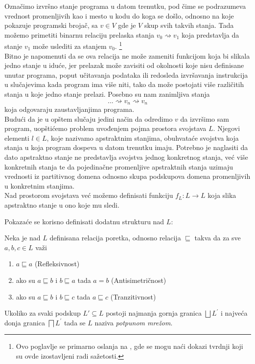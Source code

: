 Označimo izvršno stanje programa u datom trenutku, pod čime se podrazumeva vrednost promenljivih kao i mesto u kodu do koga se došlo, odnosno na koje pokazuje programski brojač, sa $v \in V$ gde je $V$ skup svih takvih stanja. Tada možemo primetiti binarnu relaciju prelaska stanja $v_{0} \rightsquigarrow v_{1}$ koja predstavlja da stanje $v_{1}$ može uslediti za stanjem $v_{0}$. \footnote{Ovo poglavlje se primarno oslanja na \cite{salcianu}, gde se mogu naći dokazi tvrdnji koji su ovde izostavljeni radi sažetosti.} \\

Bitno je napomenuti da se ova relacija ne može zameniti funkcijom koja bi slikala jedno stanje u iduće, jer prelazak može zavisiti od okolnosti koje nisu definisane unutar programa, poput učitavanja podataka ili redosleda izvršavanja instrukcija u slučajevima kada program ima više niti, tako da može postojati više različitih stanja u koje jedno stanje prelazi. Posebno su nam zanimljiva stanja $$... \rightsquigarrow v_{n} \rightsquigarrow v_{n}$$ koja odgovaraju zaustavljanjima programa. \\
 
Budući da je u opštem slučaju jedini način da odredimo $v$ da izvršimo sam program, uopštićemo problem uvođenjem pojma prostora svojstava $L$. Njegovi elementi $l \in L$, koje nazivamo apstraktnim stanjima, obuhvataće svojstva koja stanja u koja program dospeva u datom trenutku imaju. Potrebno je naglasiti da dato apstraktno stanje ne predstavlja svojstva jednog konkretnog stanja, već više konkretnih stanja te da pojedinačne promenljive apstraktnih stanja uzimaju vrednosti iz partitivnog domena odnosno skupa podskupova domena promenljivih u konkretnim stanjima.\cite{denotationalsemantics} \\

Nad prostorom svojstava već možemo definisati funkciju $f_{L}:L\rightarrow L$ koja slika apstraktno stanje u ono koje mu sledi.

Pokazaće se korisno definisati dodatnu strukturu nad $L$: \\
\begin{definicija}
Neka je nad $L$ definisana relacija poretka, odnosno relacija $\sqsubseteq$ takva da za sve $a, b, c \in L$ važi
\begin{enumerate}
\item $a \sqsubseteq a$ (Refleksivnost)
\item ako su $a \sqsubseteq b$ i $b \sqsubseteq a$ tada $a = b$ (Antisimetričnost)
\item ako su $a \sqsubseteq b$ i $b \sqsubseteq c$ tada $a \sqsubseteq c$ (Tranzitivnost)
\end{enumerate}
Ukoliko za svaki podskup $L\prime \subseteq L$ postoji najmanja gornja granica $\bigsqcup L^{\prime}$ i najveća donja granica $\bigsqcap L^{\prime}$ tada se $L$ naziva \emph{potpunom mrežom}. \cite{algebra}
\end{definicija} 

